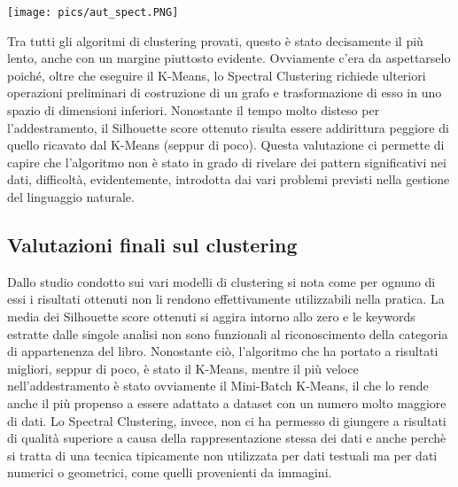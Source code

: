 \documentclass[12pt,oneside]{article}
\begin{document}
\begin{enumerate}
    \texttt{[image: pics/aut\_spect.PNG]}
    
    \begin{justify}
    Tra tutti gli algoritmi di clustering provati, questo è stato decisamente il più lento, anche con un margine piuttosto evidente. Ovviamente c’era da aspettarselo poiché, oltre che eseguire il K-Means, lo Spectral Clustering richiede ulteriori operazioni preliminari di costruzione di un grafo e trasformazione di esso in uno spazio di dimensioni inferiori. Nonostante il tempo molto disteso per l’addestramento, il Silhouette score ottenuto risulta essere addirittura peggiore di quello ricavato dal K-Means (seppur di poco). Questa valutazione ci permette di capire che l’algoritmo non è stato in grado di rivelare dei pattern significativi nei dati, difficoltà, evidentemente, introdotta dai vari problemi previsti nella gestione del linguaggio naturale.
    \end{justify}
    \end{enumerate}

    \begin{enumerate}
    \subsection{Valutazioni finali sul clustering}
    \begin{justify}
        Dallo studio condotto sui vari modelli di clustering si nota come per ognuno di essi i risultati ottenuti non li rendono effettivamente utilizzabili nella pratica. La media dei Silhouette score ottenuti si aggira intorno allo zero e le keywords estratte dalle singole analisi non sono funzionali al riconoscimento della categoria di appartenenza del libro. 
        Nonostante ciò, l’algoritmo che ha portato a risultati migliori, seppur di poco, è stato il K-Means, mentre il più veloce nell’addestramento è stato ovviamente il Mini-Batch K-Means, il che lo rende anche il più propenso a essere adattato a dataset con un numero molto maggiore di dati.
        Lo Spectral Clustering, invece, non ci ha permesso di giungere a risultati di qualità superiore a causa della rappresentazione stessa dei dati e anche perchè si tratta di una tecnica tipicamente non utilizzata per dati testuali ma per dati numerici o geometrici, come quelli provenienti da immagini.
    \end{justify}
    \end{enumerate}
\end{document}
